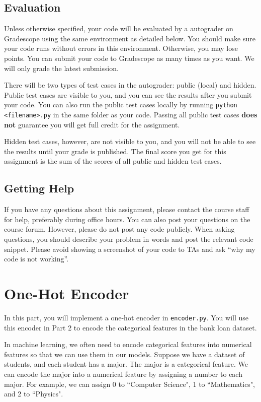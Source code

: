 \documentclass{article}
\begin{document}
\subsection*{Evaluation}
Unless otherwise specified, your code will be evaluated by a autograder on Gradescope using the same environment as detailed below. You should make sure your code runs without errors in this environment. Otherwise, you may lose points. You can submit your code to Gradescope as many times as you want. We will only grade the latest submission.

There will be two types of test cases in the autograder: public (local) and hidden. Public test cases are visible to you, and you can see the results after you submit your code. You can also run the public test cases locally by running \verb|python <filename>.py| in the same folder as your code. Passing all public test cases \textbf{does not} guarantee you will get full credit for the assignment.

Hidden test cases, however, are not visible to you, and you will not be able to see the results until
your grade is published. The final score you get for this assignment is the sum of the scores of all
public and hidden test cases.

\subsection*{Getting Help}
If you have any questions about this assignment, please contact the course staff for help, preferably during office hours. You can also post your questions on the course forum. However, please do not post any code publicly. When asking questions, you should describe your problem in words and post the relevant code snippet. Please avoid showing a screenshot of your code to TAs and ask ``why my code is not working”.


\section{ One-Hot Encoder}
In this part, you will implement a one-hot encoder in \verb|encoder.py|. You will use this encoder in Part 2 to encode the categorical features in the bank loan dataset.

In machine learning, we often need to encode categorical features into numerical features so that we can use them in our models. Suppose we have a dataset of students, and each student has a major. The major is a categorical feature. We can encode the major into a numerical feature by assigning a number to each major. For example, we can assign 0 to ``Computer Science", 1 to ``Mathematics", and 2 to ``Physics".
\end{document}
